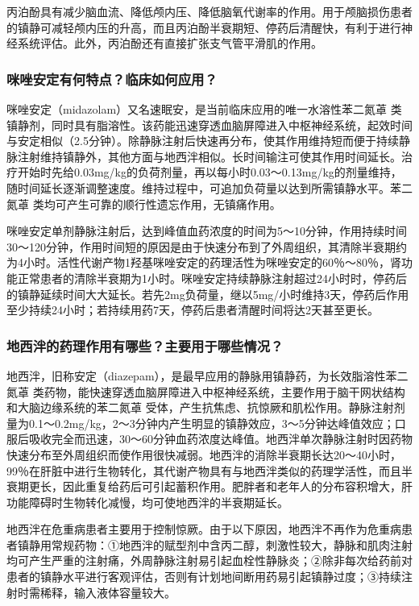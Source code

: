 丙泊酚具有减少脑血流、降低颅内压、降低脑氧代谢率的作用。用于颅脑损伤患者的镇静可减轻颅内压的升高，而且丙泊酚半衰期短、停药后清醒快，有利于进行神经系统评估。此外，丙泊酚还有直接扩张支气管平滑肌的作用。

\subsubsection{咪唑安定有何特点？临床如何应用？}

咪唑安定（midazolam）又名速眠安，是当前临床应用的唯一水溶性苯二氮䓬
类镇静剂，同时具有脂溶性。该药能迅速穿透血脑屏障进入中枢神经系统，起效时间与安定相似（2.5分钟）。除静脉注射后快速再分布，使其作用维持短而便于持续静脉注射维持镇静外，其他方面与地西泮相似。长时间输注可使其作用时间延长。治疗开始时先给0.03mg/kg的负荷剂量，再以每小时0.03～0.13mg/kg的剂量维持，随时间延长逐渐调整速度。维持过程中，可追加负荷量以达到所需镇静水平。苯二氮䓬
类均可产生可靠的顺行性遗忘作用，无镇痛作用。

咪唑安定单剂静脉注射后，达到峰值血药浓度的时间为5～10分钟，作用持续时间30～120分钟，作用时间短的原因是由于快速分布到了外周组织，其清除半衰期约为4小时。活性代谢产物1羟基咪唑安定的药理活性为咪唑安定的60％～80％，肾功能正常患者的清除半衰期为1小时。咪唑安定持续静脉注射超过24小时时，停药后的镇静延续时间大大延长。若先2mg负荷量，继以5mg/小时维持3天，停药后作用至少持续24小时；若持续用药7天，停药后患者清醒时间将达2天甚至更长。

\subsubsection{地西泮的药理作用有哪些？主要用于哪些情况？}

地西泮，旧称安定（diazepam），是最早应用的静脉用镇静药，为长效脂溶性苯二氮䓬
类药物，能快速穿透血脑屏障进入中枢神经系统，主要作用于脑干网状结构和大脑边缘系统的苯二氮䓬
受体，产生抗焦虑、抗惊厥和肌松作用。静脉注射剂量为0.1～0.2mg/kg，2～3分钟内产生明显的镇静效应，3～5分钟达峰值效应；口服后吸收完全而迅速，30～60分钟血药浓度达峰值。地西泮单次静脉注射时因药物快速分布至外周组织而使作用很快减弱。地西泮的消除半衰期长达20～40小时，99％在肝脏中进行生物转化，其代谢产物具有与地西泮类似的药理学活性，而且半衰期更长，因此重复给药后可引起蓄积作用。肥胖者和老年人的分布容积增大，肝功能障碍时生物转化减慢，均可使地西泮的半衰期延长。

地西泮在危重病患者主要用于控制惊厥。由于以下原因，地西泮不再作为危重病患者镇静用常规药物：①地西泮的赋型剂中含丙二醇，刺激性较大，静脉和肌肉注射均可产生严重的注射痛，外周静脉注射易引起血栓性静脉炎；②除非每次给药前对患者的镇静水平进行客观评估，否则有计划地间断用药易引起镇静过度；③持续注射时需稀释，输入液体容量较大。

